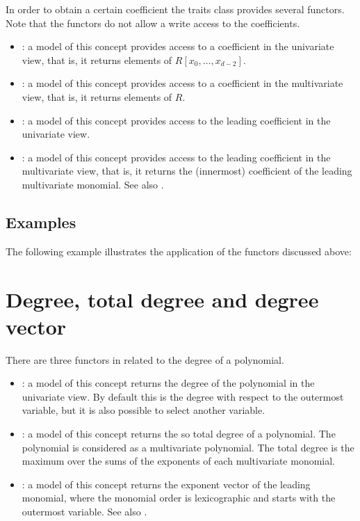 In order to obtain a certain coefficient the traits class provides 
several functors. 
Note that the functors do not allow a write access to the coefficients. 
\begin{itemize}
\item {}: 
a model of this concept provides access to a coefficient in the univariate view,
that is, it returns elements of $R[x_0,\dots,x_{d-2}]$.
\item {}: 
a model of this concept provides access to a coefficient in the multivariate 
view, that is, it returns elements of $R$.
\item {}: 
a model of this concept provides access to the leading coefficient in 
the univariate view. 
\item {}: 
a model of this concept provides access to the leading coefficient in 
the multivariate view, that is,
it returns the (innermost) coefficient of the leading multivariate monomial. 
See also  .          
\end{itemize}

\subsection{Examples}
The following example illustrates the application of the functors 
discussed above:


\section{Degree, total degree and degree vector}

There are three functors in  
related to the degree of a polynomial. 
\begin{itemize}
\item {}: 
a model of this concept returns the degree of the polynomial in the univariate 
view. By default this is the degree with respect to the outermost variable, 
but it is also possible to select another variable. 
\item {}: 
a model of this concept returns the so total degree of a polynomial. 
The polynomial is considered as a multivariate polynomial. 
The total degree is the maximum over the sums of the exponents of each 
multivariate monomial. 
\item {}:
a model of this concept returns the exponent vector of the leading monomial,
where the monomial order is lexicographic and starts with the outermost 
variable. See also  . 
\end{itemize}

